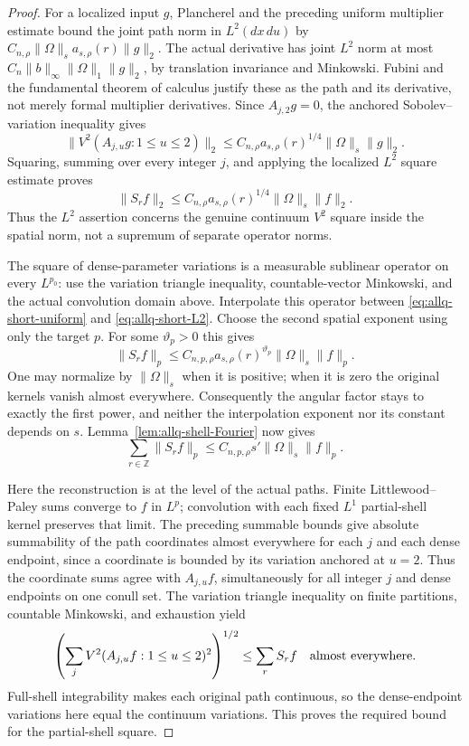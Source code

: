 \documentclass[11pt]{article}
\numberwithin{equation}{section}
\theoremstyle{remark}
\theoremstyle{definition}
\begin{document}
\begin{proof}
For a localized input $g$, Plancherel and the preceding uniform
multiplier estimate bound the joint path norm in $L^2(dx\,du)$ by
$C_{n,\rho}\|\Omega\|_s a_{s,\rho}(r)\|g\|_2$.
The actual derivative has joint $L^2$ norm at most
$C_n\|b\|_\infty\|\Omega\|_1\|g\|_2$, by translation invariance
and Minkowski.  Fubini and the fundamental theorem of calculus
justify these as the path and its derivative, not merely formal
multiplier derivatives.  Since $A_{j,2}g=0$, the anchored
Sobolev--variation inequality gives
\[
 \|V^2(A_{j,u}g:1\le u\le2)\|_2
 \le C_{n,\rho}a_{s,\rho}(r)^{1/4}\|\Omega\|_s\|g\|_2.
\]
Squaring, summing over every integer $j$, and applying the localized
$L^2$ square estimate proves
\begin{equation}\label{eq:allq-short-L2}
 \|S_rf\|_2\le C_{n,\rho}a_{s,\rho}(r)^{1/4}
                         \|\Omega\|_s\|f\|_2.
\end{equation}
Thus the $L^2$ assertion concerns the genuine continuum $V^2$ square
inside the spatial norm, not a supremum of separate operator norms.

The square of dense-parameter variations is a measurable sublinear
operator on every $L^{p_0}$: use the variation triangle inequality,
countable-vector Minkowski, and the actual convolution domain above.
Interpolate this operator between \eqref{eq:allq-short-uniform} and
\eqref{eq:allq-short-L2}.  Choose the second spatial exponent using
only the target $p$.  For some $\vartheta_p>0$ this gives
\[
 \|S_rf\|_p\le C_{n,p,\rho}a_{s,\rho}(r)^{\vartheta_p}
                         \|\Omega\|_s\|f\|_p.
\]
One may normalize by $\|\Omega\|_s$ when it is positive; when it is
zero the original kernels vanish almost everywhere.  Consequently the
angular factor stays to exactly the first power, and neither the
interpolation exponent nor its constant depends on $s$.
Lemma~\ref{lem:allq-shell-Fourier} now gives
\[
 \sum_{r\in\mathbb Z}\|S_rf\|_p
 \le C_{n,p,\rho}s'\|\Omega\|_s\|f\|_p.
\]

Here the reconstruction is at the level of the actual paths.
Finite Littlewood--Paley sums converge to $f$ in $L^p$; convolution
with each fixed $L^1$ partial-shell kernel preserves that limit.
The preceding summable bounds give absolute summability of the path
coordinates almost everywhere for each $j$ and each dense endpoint,
since a coordinate is bounded by its variation anchored at $u=2$.
Thus the coordinate sums agree with $A_{j,u}f$, simultaneously for
all integer $j$ and dense endpoints on one conull set.
The variation triangle inequality on finite partitions, countable
Minkowski, and exhaustion yield
\[
 \left(\sum_jV^2(A_{j,u}f:1\le u\le2)^2\right)^{1/2}
 \le\sum_rS_rf\quad\hbox{almost everywhere}.
\]
Full-shell integrability makes each original path continuous, so the
dense-endpoint variations here equal the continuum variations.
This proves the required bound for the partial-shell square.


\end{proof}
\end{document}
